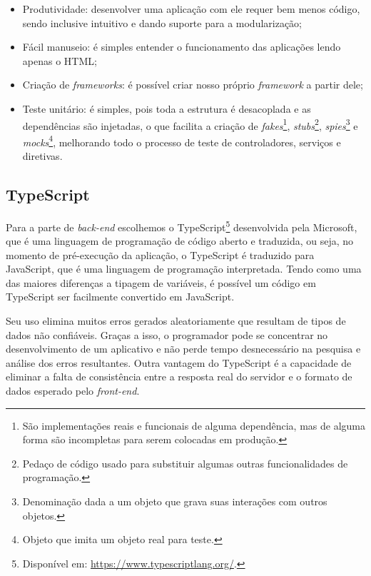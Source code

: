 \begin{itemize}
    \item Produtividade: desenvolver uma aplicação com ele requer bem menos código, sendo inclusive intuitivo e dando suporte para a modularização;
    \item Fácil manuseio: é simples entender o funcionamento das aplicações lendo apenas o HTML;
    \item Criação de \textit{frameworks}: é possível criar nosso próprio \textit{framework} a partir dele;
    \item Teste unitário: é simples, pois toda a estrutura é desacoplada e as dependências são injetadas, o que facilita a criação de \textit{fakes}\footnote{São implementações reais e funcionais de alguma dependência, mas de alguma forma são incompletas para serem colocadas em produção.}, \textit{stubs}\footnote{Pedaço de código usado para substituir algumas outras funcionalidades de programação.}, \textit{spies}\footnote{Denominação dada a um objeto que grava suas interações com outros objetos.} e \textit{mocks}\footnote{Objeto que imita um objeto real para teste.}, melhorando todo o processo de teste de controladores, serviços e diretivas.
\end{itemize}

\subsection{TypeScript}
\label{ssec:TypeScript}
Para a parte de \textit{back-end} escolhemos o TypeScript\footnote{Disponível em: \url{https://www.typescriptlang.org/}.} desenvolvida pela Microsoft, que é uma linguagem de programação de código aberto e traduzida, ou seja, no momento de pré-execução da aplicação, o TypeScript é traduzido para JavaScript, que é uma linguagem de programação interpretada. Tendo como uma das maiores diferenças a tipagem de variáveis, é possível um código em TypeScript ser facilmente convertido em JavaScript. 

Seu uso elimina muitos erros gerados aleatoriamente que resultam de tipos de dados não confiáveis. Graças a isso, o programador pode se concentrar no desenvolvimento de um aplicativo e não perde tempo desnecessário na pesquisa e análise dos erros resultantes. Outra vantagem do TypeScript é a capacidade de eliminar a falta de consistência entre a resposta real do servidor e o formato de dados esperado pelo \textit{front-end}. \cite{Jakub2019TypeScript}

